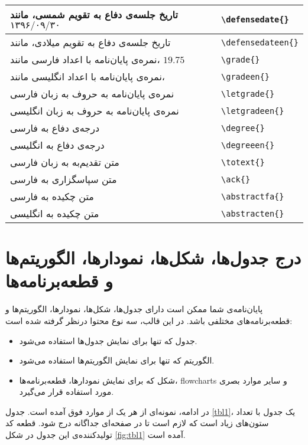 \begin{longtable}[c]{| L{.45\textwidth} | R{.45\textwidth} |}
		تاریخ جلسه‌ی دفاع به تقویم شمسی، مانند $۱۳۹۶/۰۹/۳۰$ &  \verb|\defensedate{}| \\ \hline
		تاریخ جلسه‌ی دفاع به تقویم میلادی، مانند   &  \verb|\defensedateen{}| \\ \hline
		نمره‌ی پایان‌نامه با اعداد فارسی مانند، $19.75$ &  \verb|\grade{}| \\ \hline
		نمره‌ی پایان‌نامه با اعداد انگلیسی مانند،  &  \verb|\gradeen{}| \\ \hline
		نمره‌ی پایان‌نامه به حروف به زبان فارسی &  \verb|\letgrade{}| \\ \hline
		نمره‌ی پایان‌نامه به حروف به زبان انگلیسی  &  \verb|\letgradeen{}| \\ \hline
		درجه‌ی دفاع به فارسی &  \verb|\degree{}| \\ \hline
		درجه‌ی دفاع به انگلیسی &  \verb|\degreeen{}| \\ \hline
		متن تقدیم‌به به زبان فارسی &  \verb|\totext{}| \\ \hline
		متن سپاسگزاری به فارسی &  \verb|\ack{}| \\ \hline
		متن چکیده به فارسی &  \verb|\abstractfa{}| \\ \hline
		متن چکیده به انگلیسی &  \verb|\abstracten{}| \\ \hline
	\end{longtable}

		\section{درج جدول‌ها، شکل‌ها، نمودارها، الگوریتم‌ها و قطعه‌برنامه‌ها}\label{sec:figs_tbls_algs_codes}
		پایان‌نامه‌ی شما ممکن است دارای جدول‌ها، شکل‌ها، نمودارها، الگوریتم‌ها و قطعه‌برنامه‌های مختلفی باشد. در این قالب، سه نوع محتوا درنظر گرفته شده است:
		\begin{itemize}
			\item جدول که تنها برای نمایش جدول‌ها استفاده می‌شود.
				\item الگوریتم که تنها برای نمایش الگوریتم‌ها استفاده می‌شود. 
			\item شکل که برای نمایش نمودارها،  قطعه‌برنامه‌ها، \glspl{flowchart} و سایر موارد بصری مورد استفاده قرار می‌گیرد.
		\end{itemize}
		
		در ادامه، نمونه‌ای از هر یک از موارد فوق آمده است. جدول \ref{tbl1}، یک جدول با تعداد ستون‌های زیاد است که لازم است تا در صفحه‌ای جداگانه درج شود. قطعه کد تولیدکننده‌ی این جدول در شکل \ref{fig:tbl1} آمده است. 
		
